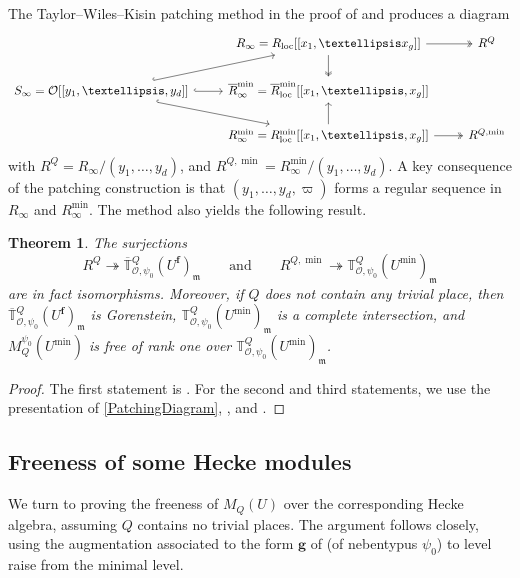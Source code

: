 \documentclass[a4paper, notitlepage, 10pt]{amsart}
\theoremstyle{plain} %
\newtheorem{theorem}{Theorem}[section]
\theoremstyle{definition} %
\theoremstyle{remark} %
\numberwithin{equation}{section}
\begin{document}
The Taylor--Wiles--Kisin patching method in the proof of \cite[Theorem 6.4]{BKM2} and \cite[Theorem 6.3]{BKM1} produces a diagram
\begin{equation}
            \begin{tikzcd}
        & R_\infty = R_{\text{loc}}[[x_1,\dots x_g]] \arrow[r,twoheadrightarrow] \arrow[d,twoheadrightarrow] &  R^Q 
        \\ S_\infty=\mathcal{O}[[y_1,\dots,y_d]] \arrow[ur,hookrightarrow] \arrow[r,hookrightarrow] \arrow[dr,hookrightarrow] & \overline{R}_\infty^{\min}=\overline{R}^{\min}_{\text{loc}}[[x_1,\dots,x_g]]
        \\ & R_\infty^{\min} = R^{\min}_{\text{loc}}[[x_1,\dots,x_g]]  \arrow[u] \arrow[r,twoheadrightarrow] & R^{Q,\min}
    \end{tikzcd}
    \label{PatchingDiagram}
\end{equation}
with $R^Q=R_\infty/(y_1,\dots,y_d)$, and $R^{Q,\min}=R_\infty^{\min}/(y_1,\dots,y_d)$. A key consequence of the patching construction is that
 $(y_1,\dots,y_d,\varpi)$ forms a regular sequence in $R_{\infty}$ and $R_{\infty}^{\min}$. The method also yields the following result.
\begin{theorem}\label{R=T}
The surjections
\begin{equation*}
    R^{Q}\twoheadrightarrow \overline{\mathbb{T}}{}^{Q}_{\mathcal{O},\psi_0}(U^{\mathbf{f}})_{\mathfrak{m}} \quad \quad \text{and} \quad \quad R^{Q,\min}\twoheadrightarrow \mathbb{T}^{Q}_{\mathcal{O},\psi_0}(U^{\min})_{\mathfrak{m}}
\end{equation*}
are in fact isomorphisms. Moreover, if $Q$ does not contain any trivial place, then $\overline{\mathbb{T}}{}^{Q}_{\mathcal{O},\psi_0}(U^{\mathbf{f}})_{\mathfrak{m}}$ 
is Gorenstein, $\mathbb{T}^{Q}_{\mathcal{O},\psi_0}(U^{\min})_{\mathfrak{m}}$ is a complete intersection, and $M_Q^{\psi_0}(U^{\min})$ is free of rank one over $\mathbb{T}^{Q}_{\mathcal{O},\psi_0}(U^{\min})_{\mathfrak{m}}$.
\end{theorem}
\begin{proof}
    The first statement is \cite[Theorem 6.4]{BKM2}. For the second and third statements, we use the presentation of \eqref{PatchingDiagram}, \cite[Lemma 4.4 (3-4)]{BKM1}, and .
\end{proof}
\subsection{Freeness of some Hecke modules}\label{freenessofM}
 We turn to proving the freeness of $M_Q(U)$ over the corresponding Hecke algebra, assuming $Q$ contains no trivial places. The argument follows \cite[\S 3.2]{Diamond97} closely, using the augmentation associated to the form $\mathbf{g}$ of  (of nebentypus $\psi_0$) to level raise from the minimal level.
\end{document}
